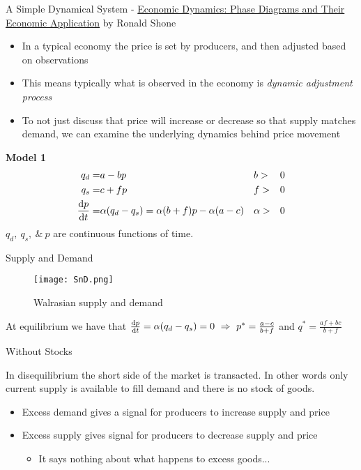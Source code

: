 \documentclass{article}
\begin{document}
	A Simple Dynamical System - \underline{Economic Dynamics: Phase Diagrams and Their Economic Application} by Ronald Shone
	\begin{itemize}
		\item In a typical economy the price is set by producers, and then adjusted based on observations
		\item This means typically what is observed in the economy is \emph{dynamic adjustment process}
		\item To not just discuss that price will increase or decrease so that supply matches demand, we can examine the underlying dynamics behind price movement
	\end{itemize}
	
	\textbf{Model 1}
	\begin{align*}
		q_d =& a - bp && b >& 0\\ %
		q_s =& c + fp && f >& 0 \\ %
		\frac{\d p}{\d t} =& \alpha(q_d - q_s) = \alpha(b+f)p - \alpha(a-c) && \alpha >& 0
	\end{align*}
	$q_d,\ q_s,\ \&\ p$ are continuous functions of time.

Supply and Demand
	\begin{figure}
		\centering
			\texttt{[image: SnD.png]}
		\caption{Walrasian supply and demand}
	\end{figure}
	
	At equilibrium we have that $\frac{\mathrm{d} p}{\mathrm{d} t} = \alpha(q_d - q_s) = 0 \ \Rightarrow \ p^* = \frac{a-c}{b+f}$ and $q^* = \frac{af + bc}{b+f}$

Without Stocks
	\begin{assumption}
		In disequilibrium the short side of the market is transacted. In other words only current supply is available to fill demand and there is no stock of goods.
	\end{assumption}
	\begin{itemize}
		\item Excess demand gives a signal for producers to increase supply and price
		\item Excess supply gives signal for producers to decrease supply and price
		\begin{itemize}
			\item It says nothing about what happens to excess goods...
		\end{itemize}
	\end{itemize}	
\end{document}
